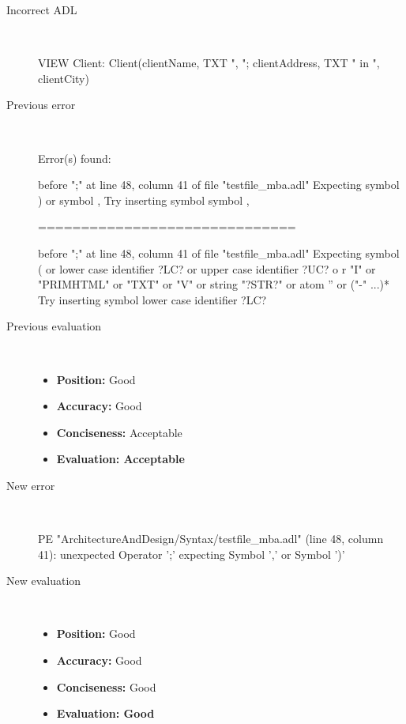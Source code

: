 \hrulefill

\begin{description}
  \item[Incorrect ADL]~\\
\begin{adl}
VIEW Client: Client(clientName, TXT ", "; clientAddress, TXT " in ", clientCity)\end{adl}
  \item[Previous error]~\\
\begin{haskell}
Error(s) found:

before ";" at line 48, column 41 of file "testfile_mba.adl"
Expecting symbol ) or symbol ,
Try inserting symbol symbol ,

==============================

before ";" at line 48, column 41 of file "testfile_mba.adl"
Expecting symbol ( or lower case identifier ?LC? or upper case identifier ?UC? o
r "I" or "PRIMHTML" or "TXT" or "V" or string "?STR?" or atom '' or ("-" ...)*
Try inserting symbol lower case identifier ?LC?
\end{haskell}
  \item[Previous evaluation]~\\
    \begin{itemize}
    \item \textbf{Position:} Good
    \item \textbf{Accuracy:} Good
    \item \textbf{Conciseness:} Acceptable
    \item \textbf{Evaluation: Acceptable}
    \end{itemize}
  \item[New error]~\\
\begin{haskell}
PE "ArchitectureAndDesign/Syntax/testfile_mba.adl" (line 48, column 41):
unexpected Operator ';'
expecting Symbol ',' or Symbol ')'\end{haskell}
  \item[New evaluation]~\\
    \begin{itemize}
    \item \textbf{Position:} Good
    \item \textbf{Accuracy:} Good
    \item \textbf{Conciseness:} Good
    \item \textbf{Evaluation: Good}
    \end{itemize}
  \end{description}

